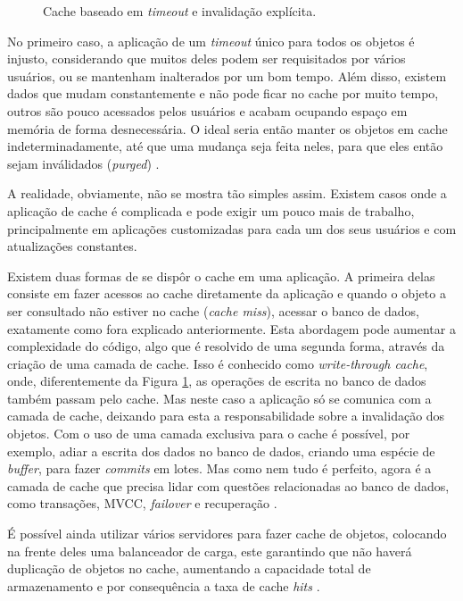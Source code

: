 \documentclass[diss]{template/setrem}
\begin{document}
\begin{figure}[!h]
    \caption{Cache baseado em \emph{timeout} e invalidação explícita.}
    \label{fig:cache}
\end{figure}

No primeiro caso, a aplicação de um \emph{timeout} único para todos os objetos é injusto, considerando que muitos deles podem ser requisitados por vários usuários, ou se mantenham inalterados por um bom tempo. Além disso, existem dados que mudam constantemente e não pode ficar no cache por muito tempo, outros são pouco acessados pelos usuários e acabam ocupando espaço em memória de forma desnecessária. O ideal seria então manter os objetos em cache indeterminadamente, até que uma mudança seja feita neles, para que eles então sejam inválidados (\emph{purged}) \citep{Schlossnagle2006}.

A realidade, obviamente, não se mostra tão simples assim. Existem casos onde a aplicação de cache é complicada e pode exigir um pouco mais de trabalho, principalmente em aplicações customizadas para cada um dos seus usuários e com atualizações constantes.

Existem duas formas de se dispôr o cache em uma aplicação. A primeira delas consiste em fazer acessos ao cache diretamente da aplicação e quando o objeto a ser consultado não estiver no cache (\emph{cache miss}), acessar o banco de dados, exatamente como fora explicado anteriormente. Esta abordagem pode aumentar a complexidade do código, algo que é resolvido de uma segunda forma, através da criação de uma camada de cache. Isso é conhecido como \emph{write-through cache}, onde, diferentemente da Figura \ref{fig:cache}, as operações de escrita no banco de dados também passam pelo cache. Mas neste caso a aplicação só se comunica com a camada de cache, deixando para esta a responsabilidade sobre a invalidação dos objetos. Com o uso de uma camada exclusiva para o cache é possível, por exemplo, adiar a escrita dos dados no banco de dados, criando uma espécie de \emph{buffer}, para fazer \emph{commits} em lotes. Mas como nem tudo é perfeito, agora é a camada de cache que precisa lidar com questões relacionadas ao banco de dados, como transações, MVCC, \emph{failover} e recuperação \citep{Henderson2006}.

É possível ainda utilizar vários servidores para fazer cache de objetos, colocando na frente deles uma balanceador de carga, este garantindo que não haverá duplicação de objetos no cache, aumentando a capacidade total de armazenamento e por consequência a taxa de cache \emph{hits} \citep{Henderson2006}.
\end{document}
